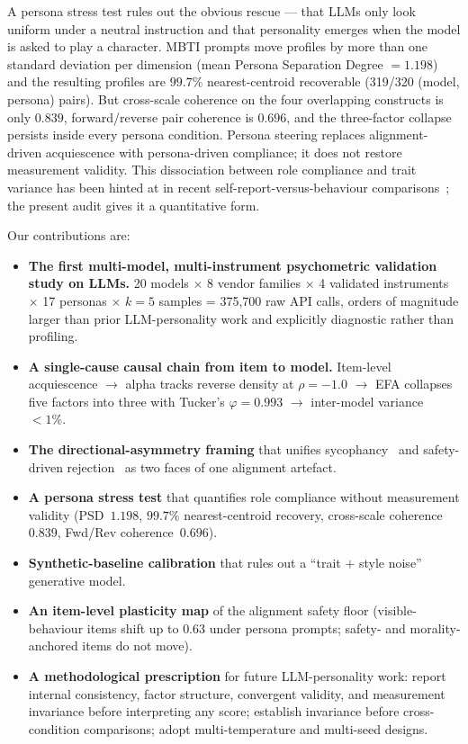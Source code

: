 A persona stress test rules out the obvious rescue --- that LLMs only look uniform under a neutral instruction and that personality emerges when the model is asked to play a character. MBTI prompts move profiles by more than one standard deviation per dimension (mean Persona Separation Degree $=1.198$) and the resulting profiles are $99.7\%$ nearest-centroid recoverable (319/320 (model, persona) pairs). But cross-scale coherence on the four overlapping constructs is only $0.839$, forward/reverse pair coherence is $0.696$, and the three-factor collapse persists inside every persona condition. Persona steering replaces alignment-driven acquiescence with persona-driven compliance; it does not restore measurement validity. This dissociation between role compliance and trait variance has been hinted at in recent self-report-versus-behaviour comparisons~\citep{han2025personality}; the present audit gives it a quantitative form.

Our contributions are:
\begin{itemize}\itemsep0pt
  \item \textbf{The first multi-model, multi-instrument psychometric validation study on LLMs.} 20 models $\times$ 8 vendor families $\times$ 4 validated instruments $\times$ 17 personas $\times$ $k=5$ samples = 375{,}700 raw API calls, orders of magnitude larger than prior LLM-personality work and explicitly diagnostic rather than profiling.
  \item \textbf{A single-cause causal chain from item to model.} Item-level acquiescence $\rightarrow$ alpha tracks reverse density at $\rho=-1.0$ $\rightarrow$ EFA collapses five factors into three with Tucker's $\varphi=0.993$ $\rightarrow$ inter-model variance $<1\%$.
  \item \textbf{The directional-asymmetry framing} that unifies sycophancy~\citep{perez2023discovering,sharma2024sycophancy} and safety-driven rejection~\citep{bai2022constitutional} as two faces of one alignment artefact.
  \item \textbf{A persona stress test} that quantifies role compliance without measurement validity (PSD~$1.198$, $99.7\%$ nearest-centroid recovery, cross-scale coherence~$0.839$, Fwd/Rev coherence~$0.696$).
  \item \textbf{Synthetic-baseline calibration} that rules out a ``trait $+$ style noise'' generative model.
  \item \textbf{An item-level plasticity map} of the alignment safety floor (visible-behaviour items shift up to $0.63$ under persona prompts; safety- and morality-anchored items do not move).
  \item \textbf{A methodological prescription} for future LLM-personality work: report internal consistency, factor structure, convergent validity, and measurement invariance before interpreting any score; establish invariance before cross-condition comparisons; adopt multi-temperature and multi-seed designs.
\end{itemize}


